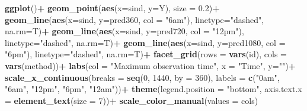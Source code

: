 \documentclass[
]{article}
\newenvironment{Shaded}{\begin{snugshade}}{\end{snugshade}}
\newcommand{\AttributeTok}[1]{\textcolor[rgb]{0.13,0.29,0.53}{#1}}
\newcommand{\DecValTok}[1]{\textcolor[rgb]{0.00,0.00,0.81}{#1}}
\newcommand{\FloatTok}[1]{\textcolor[rgb]{0.00,0.00,0.81}{#1}}
\newcommand{\FunctionTok}[1]{\textcolor[rgb]{0.13,0.29,0.53}{\textbf{#1}}}
\newcommand{\NormalTok}[1]{#1}
\newcommand{\SpecialCharTok}[1]{\textcolor[rgb]{0.81,0.36,0.00}{\textbf{#1}}}
\newcommand{\StringTok}[1]{\textcolor[rgb]{0.31,0.60,0.02}{#1}}
\begin{document}
\begin{Shaded}
\begin{Highlighting}[]
  \FunctionTok{ggplot}\NormalTok{()}\SpecialCharTok{+}
  \FunctionTok{geom\_point}\NormalTok{(}\FunctionTok{aes}\NormalTok{(}\AttributeTok{x=}\NormalTok{sind, }\AttributeTok{y=}\NormalTok{Y), }\AttributeTok{size =} \FloatTok{0.2}\NormalTok{)}\SpecialCharTok{+}
  \FunctionTok{geom\_line}\NormalTok{(}\FunctionTok{aes}\NormalTok{(}\AttributeTok{x=}\NormalTok{sind, }\AttributeTok{y=}\NormalTok{pred360, }\AttributeTok{col =} \StringTok{"6am"}\NormalTok{), }\AttributeTok{linetype=}\StringTok{"dashed"}\NormalTok{, }\AttributeTok{na.rm=}\NormalTok{T)}\SpecialCharTok{+}
  \FunctionTok{geom\_line}\NormalTok{(}\FunctionTok{aes}\NormalTok{(}\AttributeTok{x=}\NormalTok{sind, }\AttributeTok{y=}\NormalTok{pred720, }\AttributeTok{col =} \StringTok{"12pm"}\NormalTok{), }\AttributeTok{linetype=}\StringTok{"dashed"}\NormalTok{, }\AttributeTok{na.rm=}\NormalTok{T)}\SpecialCharTok{+}
  \FunctionTok{geom\_line}\NormalTok{(}\FunctionTok{aes}\NormalTok{(}\AttributeTok{x=}\NormalTok{sind, }\AttributeTok{y=}\NormalTok{pred1080, }\AttributeTok{col =} \StringTok{"6pm"}\NormalTok{), }\AttributeTok{linetype=}\StringTok{"dashed"}\NormalTok{, }\AttributeTok{na.rm=}\NormalTok{T)}\SpecialCharTok{+}
  \FunctionTok{facet\_grid}\NormalTok{(}\AttributeTok{rows =} \FunctionTok{vars}\NormalTok{(id), }\AttributeTok{cols =} \FunctionTok{vars}\NormalTok{(method))}\SpecialCharTok{+}
  \FunctionTok{labs}\NormalTok{(}\AttributeTok{col =} \StringTok{"Maximum observation time"}\NormalTok{, }\AttributeTok{x =} \StringTok{"Time"}\NormalTok{, }\AttributeTok{y=}\StringTok{""}\NormalTok{)}\SpecialCharTok{+}
  \FunctionTok{scale\_x\_continuous}\NormalTok{(}\AttributeTok{breaks =} \FunctionTok{seq}\NormalTok{(}\DecValTok{0}\NormalTok{, }\DecValTok{1440}\NormalTok{, }\AttributeTok{by =} \DecValTok{360}\NormalTok{),}
                     \AttributeTok{labels =} \FunctionTok{c}\NormalTok{(}\StringTok{"0am"}\NormalTok{, }\StringTok{"6am"}\NormalTok{, }\StringTok{"12pm"}\NormalTok{, }\StringTok{"6pm"}\NormalTok{, }\StringTok{"12am"}\NormalTok{))}\SpecialCharTok{+}
  \FunctionTok{theme}\NormalTok{(}\AttributeTok{legend.position =} \StringTok{"bottom"}\NormalTok{, }\AttributeTok{axis.text.x =} \FunctionTok{element\_text}\NormalTok{(}\AttributeTok{size =} \DecValTok{7}\NormalTok{))}\SpecialCharTok{+}
  \FunctionTok{scale\_color\_manual}\NormalTok{(}\AttributeTok{values =}\NormalTok{ cols)}
\end{Highlighting}
\end{Shaded}
\end{document}
